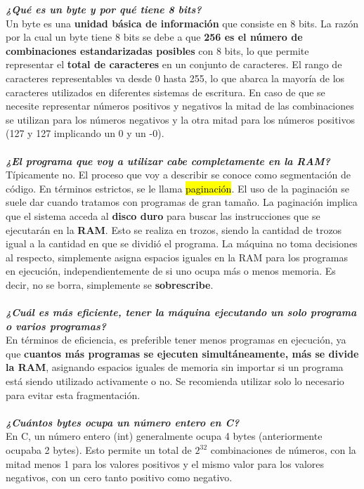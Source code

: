 \documentclass{templateNote}
\begin{document}
\noindent \textit{\textbf{¿Qué es un byte y por qué tiene 8 bits?}} \\
Un byte es una \textbf{unidad básica de información} que consiste en 8 bits. La razón por la cual un byte tiene 8 bits se debe a que 
\textbf{256 es el número de combinaciones estandarizadas posibles} con 8 bits, lo que permite representar el \textbf{total de caracteres} en 
un conjunto de caracteres. El rango de caracteres representables va desde 0 hasta 255, lo que abarca la mayoría de los caracteres 
utilizados en diferentes sistemas de escritura. En caso de que se necesite representar números positivos y negativos la mitad de 
las combinaciones se utilizan para los números negativos y la otra mitad para los números positivos (127 y 127 implicando un 0 y un -0).
\\\\
\noindent \textit{\textbf{¿El programa que voy a utilizar cabe completamente en la RAM?}} \\
Típicamente no. El proceso que voy a describir se conoce como segmentación de código. En términos estrictos, se le llama \hl{paginación}. 
El uso de la paginación se suele dar cuando tratamos con programas de gran tamaño.
La paginación implica que el sistema acceda al \textbf{disco duro} para buscar las instrucciones que se ejecutarán en la \textbf{RAM}. Esto se realiza 
en trozos, siendo la cantidad de trozos igual a la cantidad en que se dividió el programa. La máquina no toma decisiones al respecto, 
simplemente asigna espacios iguales en la RAM para los programas en ejecución, independientemente de si uno ocupa más o menos memoria. 
Es decir, no se borra, simplemente se \textbf{sobrescribe}.
\\\\
\noindent \textit{\textbf{¿Cuál es más eficiente, tener la máquina ejecutando un solo programa o varios programas?}}\\
En términos de eficiencia, es preferible tener menos programas en ejecución, ya que \textbf{cuantos más programas se ejecuten simultáneamente, más se divide la RAM}, 
asignando espacios iguales de memoria sin importar si un programa está siendo utilizado activamente o no. Se recomienda utilizar solo lo necesario para evitar
esta fragmentación.
\\\\
\noindent \textit{\textbf{¿Cuántos bytes ocupa un número entero en C?}}\\
En C, un número entero (int) generalmente ocupa 4 bytes (anteriormente ocupaba 2 bytes). Esto permite un total de $2^{32}$ combinaciones de números, con la mitad 
menos 1 para los valores positivos y el mismo valor para los valores negativos, con un cero tanto positivo como negativo.
\end{document}
